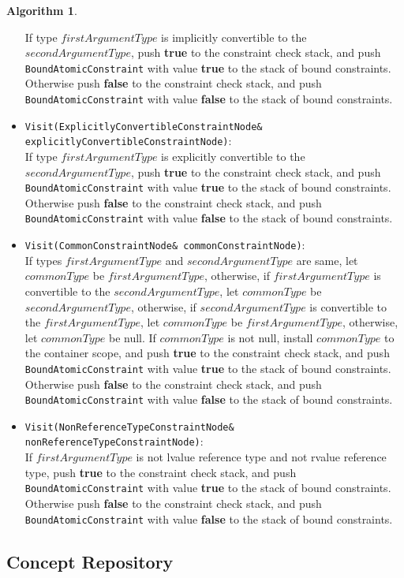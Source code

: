 \documentclass[a4paper,oneside,11pt]{book}
\theoremstyle{definition}
\newtheorem{algo}{Algorithm}[section]
\begin{document}
\begin{algo}
\begin{itemize}
If type $firstArgumentType$ is implicitly convertible to the $secondArgumentType$, push \textbf{true} to the constraint check stack, and
push \verb|BoundAtomicConstraint| with value \textbf{true} to the stack of bound constraints.
Otherwise push \textbf{false} to the constraint check stack, and
push \verb|BoundAtomicConstraint| with value \textbf{false} to the stack of bound constraints.
\item
\verb|Visit(ExplicitlyConvertibleConstraintNode& explicitlyConvertibleConstraintNode)|:\\
If type $firstArgumentType$ is explicitly convertible to the $secondArgumentType$, push \textbf{true} to the constraint check stack, and
push \verb|BoundAtomicConstraint| with value \textbf{true} to the stack of bound constraints.
Otherwise push \textbf{false} to the constraint check stack, and
push \verb|BoundAtomicConstraint| with value \textbf{false} to the stack of bound constraints.
\item
\verb|Visit(CommonConstraintNode& commonConstraintNode)|:\\
If types $firstArgumentType$ and $secondArgumentType$ are same, let $commonType$ be $firstArgumentType$,
otherwise, if $firstArgumentType$ is convertible to the $secondArgumentType$, let $commonType$ be $secondArgumentType$,
otherwise, if $secondArgumentType$ is convertible to the $firstArgumentType$, let $commonType$ be $firstArgumentType$,
otherwise, let $commonType$ be null.
If $commonType$ is not null, install $commonType$ to the container scope, and push \textbf{true} to the constraint check stack, and
push \verb|BoundAtomicConstraint| with value \textbf{true} to the stack of bound constraints.
Otherwise push \textbf{false} to the constraint check stack, and
push \verb|BoundAtomicConstraint| with value \textbf{false} to the stack of bound constraints.
\item
\verb|Visit(NonReferenceTypeConstraintNode& nonReferenceTypeConstraintNode)|:\\
If $firstArgumentType$ is not lvalue reference type and not rvalue reference type, push \textbf{true} to the constraint check stack, and
push \verb|BoundAtomicConstraint| with value \textbf{true} to the stack of bound constraints.
Otherwise push \textbf{false} to the constraint check stack, and
push \verb|BoundAtomicConstraint| with value \textbf{false} to the stack of bound constraints.
\end{itemize}
\end{algo}

\subsection{Concept Repository}\label{conceptrepository}
\end{document}
